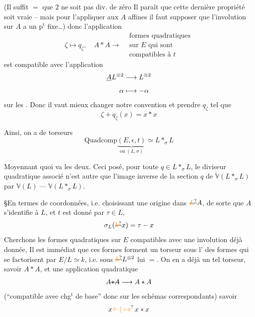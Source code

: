 (Il suffit $=$ que $2$ ne soit pas
div. de zéro \unsure{\ldots}  Il paraît que cette
dernière propriété soit vraie -- mais
pour l'appliquer aux $A$ affines 
il faut supposer que l'involution sur $A$
a un p$^{\mathrm t}$ fixe\ldots)
donc l'application
\[
\zeta\longmapsto q_\zeta,\quad A*A\longrightarrow
\begin{aligned}&\text{formes quadratiques}\\&\text{sur $E$ qui sont}\\&\text{compatibles à $t$}\end{aligned}
\]
est compatible avec l'application
\[
\begin{aligned}
\deleted{A}L^{\otimes 2}&\longrightarrow L^{\otimes 2}\\
\alpha&\longmapsto-\alpha
\end{aligned}
\]
sur les  . Donc il
vaut mieux changer notre convention
et  prendre $q_\zeta$ tel que
\[
\zeta+q_\zeta(x)=x*x
\]

Ainsi, on a  de torseurs
\[
\mathrm{Quadcomp}\underbrace{(E,\epsilon,t)}_{\text{ou }(L,\sigma)}\simeq L*_{\sigma}L
\]

Moyennant quoi  va  les
deux. Ceci posé, pour toute $q\in L*_\sigma L$,
le diviseur quadratique associé n'est
autre que l'image inverse de la section
$q$ de $\check{\mathbb V}(L*_\sigma L)$ par $\mathbb V(L)\mathbin{\text{---}}\mathbb V(L*_\sigma L)$.

\S En termes de coordonnées,
i.e. choisissant une origine dans $\deleted{\unsure{L}}A$,
de sorte que $A$ s'identifie à $L$,
et $t$ est  donné par $\tau\in L$,
\[
\sigma_L(\deleted{\unsure{k}}x)=\tau-x
\]
Cherchons les formes quadratiques 
sur $E$ compatibles avec une involution déjà donnée, 
Il est immédiat 
que ces formes forment un torseur
sous l' des formes 
qui se factorisent par $E/L\simeq k$, i.e. sous
$\deleted{\unsure{k}}L^{\otimes 2}$ lui $=$.
On en a déjà un tel torseur, savoir $A*A$, et une
application quadratique 
\[
A\deleted{*A}\longrightarrow A*A
\]
(``compatible avec chg$^{\mathrm t}$ de base'' donc
 sur les schémas correspondants)
savoir
\[
x\,\unsure{\mathrel{\vdash}|\mapsto}\,x*x
\]

